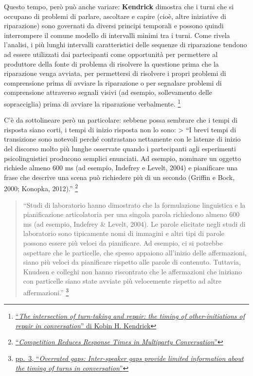 \documentclass[
]{article}
\begin{document}
Questo tempo, però può anche variare: \textbf{Kendrick} dimostra che i turni che si occupano di problemi di parlare, ascoltare e capire (cioè, altre iniziative di riparazione) sono governati da diversi principi temporali e possono quindi interrompere il comune modello di intervalli minimi tra i turni. Come rivela l'analisi, i più lunghi intervalli caratteristici delle sequenze di riparazione tendono ad essere utilizzati dai partecipanti come opportunità per permettere al produttore della fonte di problema di risolvere la questione prima che la riparazione venga avviata, per permettersi di risolvere i propri problemi di comprensione prima di avviare la riparazione o per segnalare problemi di comprensione attraverso segnali visivi (ad esempio, sollevamento delle sopracciglia) prima di avviare la riparazione verbalmente. \footnote{\href{https://www.frontiersin.org/articles/10.3389/fpsyg.2015.00250/full}{``\emph{The intersection of turn-taking and repair: the timing of other-initiations of repair in conversation}'' di Kobin H. Kendrick}}

C'è da sottolineare però un particolare: sebbene possa sembrare che i tempi di risposta siano corti, i tempi di inizio risposta non lo sono: \textgreater{} ``I brevi tempi di transizione sono notevoli perché contrastano nettamente con le latenze di inizio del discorso molto più lunghe osservate quando i partecipanti agli esperimenti psicolinguistici producono semplici enunciati. Ad esempio, nominare un oggetto richiede almeno 600 ms (ad esempio, Indefrey e Levelt, 2004) e pianificare una frase che descrive una scena può richiedere più di un secondo (Griffin e Bock, 2000; Konopka, 2012).'' \footnote{\href{DOC/fpsyg-12-693124.pdf}{``\emph{Competition Reduces Response Times in Multiparty Conversation}''}}

\begin{quote}
``Studi di laboratorio hanno dimostrato che la formulazione linguistica e la pianificazione articolatoria per una singola parola richiedono almeno 600 ms (ad esempio, Indefrey \& Levelt, 2004). Le parole elicitate negli studi di laboratorio sono tipicamente nomi di immagini e altri tipi di parole possono essere più veloci da pianificare. Ad esempio, ci si potrebbe aspettare che le particelle, che spesso appaiono all'inizio delle affermazioni, siano più veloci da pianificare rispetto alle parole di contenuto. Tuttavia, Knudsen e colleghi non hanno riscontrato che le affermazioni che iniziano con particelle siano state avviate più velocemente rispetto ad altre affermazioni.'' \footnote{\href{DOC/1-s2.0-S0010027722000257-main.pdf}{pp.~3, ``\emph{Overrated gaps: Inter-speaker gaps provide limited information about the timing of turns in conversation}''}}
\end{quote}
\end{document}
